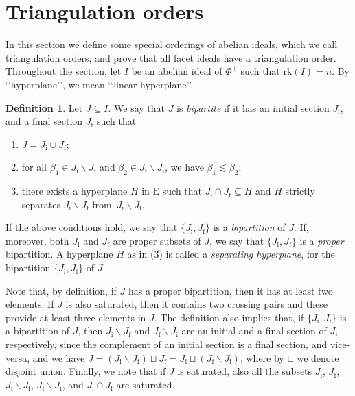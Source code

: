 \documentclass[10pt]{amsart}
\theoremstyle{definition}
\newtheorem{defi}[thm]{Definition}
\theoremstyle{remark}
\newcommand\smeno{\smallsetminus}
\newcommand\rk{\mathrm{rk}}
\newcommand\be{\beta}
\begin{document}
\section{Triangulation orders}\label{sec:triang-order} 

In this section we define some special orderings of abelian ideals, which we call triangulation orders, and prove that all facet ideals have a triangulation order.
Throughout the section, let $I$ be an abelian ideal of $\Phi^+$ such that $\rk(I)=n$.
By \lq\lq hyperplane\rq\rq, we mean  \lq\lq linear hyperplane\rq\rq.

\pagebreak


\begin{defi}\label{def:bipartite}
Let $J \subseteq I$.
We say that $J$ is {\it bipartite} if it has an initial section  $J_{\mathrm i}$, and a final section $J_{\mathrm f}$ such that 
\begin{enumerate}
\item $J=J_{\mathrm i}\cup J_{\mathrm f}$; 
\item for all $\be_1\in J_{\mathrm i}\smeno J_{\mathrm f}$  and $\be_2\in J_{\mathrm f}\smeno J_{\mathrm i}$, we have  $\be_1\lesssim \be_2$;
\item there exists a hyperplane $H$ in $\mathrm E$ such that $J_{\mathrm i}\cap J_{\mathrm f}\subseteq H$ and $H$ strictly separates  $J_{\mathrm i}\smeno J_{\mathrm f}$  from~$J_{\mathrm i}\smeno J_{\mathrm f}$.
\end{enumerate}
If the above conditions hold, we say that $\{J_{\mathrm i},J_{\mathrm f}\}$ is a  {\it bipartition} of $J$.
If, moreover, both $J_{\mathrm i}$ and  $J_{\mathrm f}$ are proper subsets of $J$, we say that $\{J_{\mathrm i},J_{\mathrm f}\}$ is a {\it proper} bipartition.  
A hyperplane $H$ as in (3) is called a {\it separating hyperplane}, for the bipartition  $\{J_{\mathrm i},J_{\mathrm f}\}$ of $J$.
\end{defi}

Note that, by definition, if $J$ has a proper bipartition, then  it has at least two elements. 
If $J$ is also saturated, then it contains two crossing pairs and these provide at least three elements in $J$.
The definition also implies that, if  $\{J_{\mathrm i}, J_{\mathrm f}\}$ is a  bipartition of $J$, then $J_{\mathrm i}\smeno J_{\mathrm f}$ and $J_{\mathrm f}\smeno J_{\mathrm i}$ are an initial and a final section of $J$, respectively, 
since the complement of an initial section is a final section, and vice-versa, and we have $J=(J_{\mathrm i}\smeno J_{\mathrm f})\sqcup J_{\mathrm f}=J_{\mathrm i}\sqcup (J_{\mathrm f}\smeno J_{\mathrm i})$, where by $\sqcup$ we denote disjoint union. 
Finally, we note that if $J$ is saturated, also all the subsets $J_{\mathrm i}$, $J_{\mathrm f}$,  $J_{\mathrm i}\smeno J_{\mathrm f}$, $J_{\mathrm f}\smeno J_{\mathrm i}$, and $J_{\mathrm i}\cap  J_{\mathrm f}$ are saturated. 
\end{document}
